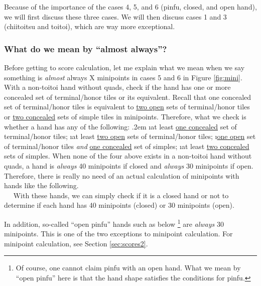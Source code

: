 \bigskip
Because of the importance of the cases 4, 5, and 6 ({\jap pinfu}, closed, and open hand), we will first discuss these three cases. We will then discuss cases 1 and 3 ({\jap chiitoitsu} and {\jap toitoi}), which are way more exceptional. 

\subsubsection{What do we mean by ``almost always''?}
Before getting to score calculation, let me explain what we mean when we say something is \emph{almost} always X minipoints in cases 5 and 6 in Figure \ref{fig:mini}. 
With a non-{\jap toitoi} hand without quads, check if the hand has one or more concealed set of terminal/honor tiles or its equivalent. Recall that one concealed set of terminal/honor tiles is equivalent to \underline{two open} sets of terminal/honor tiles or \underline{two concealed} sets of simple tiles in minipoints. 
Therefore, what we check is whether a hand has any of the following:
\bi \itemsep.2em
\i at least \underline{one concealed} set of terminal/honor tiles;
\i at least \underline{two open} sets of terminal/honor tiles;
\i \underline{one open} set of terminal/honor tiles \emph{and} 
\underline{one concealed} set of simples;
\i at least \underline{two concealed} sets of simples.
\ei
When none of the four above exists in a non-{\jap toitoi} hand without quads, a hand is \emph{always} 40 minipoints if closed and \emph{always} 30 minipoints if open. Therefore, there is really no need of an actual calculation of minipoints with hands like the following. 
\bp
{}~\zhong\rzhong\zhong\\
~\rdong\dong\dong~
\ep
With these hands, we can simply check if it is a closed hand or not to determine if each hand has 40 minipoints (closed) or 30 minipoints (open). 

\bigskip
In addition, so-called ``open {\jap pinfu}'' hands such as below \footnote{Of course, one cannot claim {\jap pinfu} with an open hand. What we mean by ``open {\jap pinfu}'' here is that the hand shape satisfies the conditions for {\jap pinfu}.} are \emph{always} 30 minipoints. This is one of the two exceptions to minipoint calculation. For minipoint calculation, see Section \ref{sec:scores2}.
\bp
{}~\\
\ep



